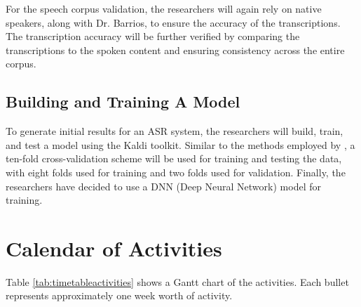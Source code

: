 For the speech corpus validation, the researchers will again rely on native speakers, along with Dr. Barrios, to ensure the accuracy of the transcriptions. The transcription accuracy will be further verified by comparing the transcriptions to the spoken content and ensuring consistency across the entire corpus.

\subsection{Building and Training A Model}
To generate initial results for an ASR system, the researchers will build, train, and test a model using the Kaldi toolkit. Similar to the methods employed by , a ten-fold cross-validation scheme will be used for training and testing the data, with eight folds used for training and two folds used for validation. Finally, the researchers have decided to use a DNN (Deep Neural Network) model for training.

\section{Calendar of Activities}


Table \ref{tab:timetableactivities} shows a Gantt chart of the activities.  Each bullet represents approximately
one week worth of activity.

%
%
\newcommand{\weekone}{\textbullet}
\newcommand{\weektwo}{\textbullet \textbullet}
\newcommand{\weekthree}{\textbullet \textbullet \textbullet}
\newcommand{\weekfour}{\textbullet \textbullet \textbullet \textbullet}

%
%

